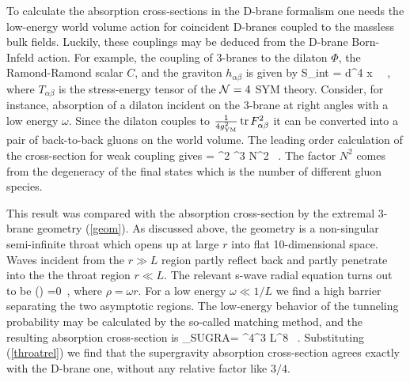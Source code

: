 \documentclass[12pt]{article}
\begin{document}
To calculate the absorption cross-sections in the D-brane formalism one
needs the low-energy world volume action for coincident D-branes coupled to
the massless bulk fields. Luckily, these couplings may be deduced
from the D-brane Born-Infeld action. For example, the coupling
of 3-branes to the dilaton $\Phi$, the Ramond-Ramond scalar $C$,
and the graviton $h_{\alpha\beta}$ is given by \cite{kleb,gukt}
\be \label{sint}
   S_{\rm int} = {\sqrt \pi\over\kappa}
\int d^4 x \,  \ ,
 \ee
 where $T_{\alpha\beta}$ is
the stress-energy tensor of the ${\cal N}=4$ SYM theory.
Consider, for instance, absorption of a dilaton incident on the 3-brane
at right angles with a low energy
$\omega$. Since the dilaton couples to 
${1\over 4 g_{\rm YM}^2}\mathop{\rm tr}\nolimits F_{\alpha\beta}^2$
it can be converted into a pair of back-to-back gluons on the world volume.
The leading order calculation of the cross-section
for weak coupling gives \cite{kleb}
\be\label{absorb}
   \sigma = {\kappa^2  \omega^3 N^2 \pi} \ .
 \ee
The factor $N^2$ comes from the degeneracy of
the final states which is the number of different gluon species.

This result was compared with the absorption cross-section by
the extremal 3-brane geometry (\ref{geom}).
As discussed above, the geometry
is a non-singular semi-infinite throat which opens up at large
$r$ into flat 10-dimensional space. 
Waves incident from the $r \gg L$ region partly reflect back and
partly penetrate into the the throat region $r \ll L$.
The relevant s-wave radial equation turns out to be \cite{kleb}
\be
\label{Coulthree}
 \psi(\rho) =0\ ,
\ee
where $\rho = \omega r$. For a low energy $\omega \ll 1/L$ we find
a high barrier separating the two asymptotic regions.
The low-energy behavior of the tunneling probability may be calculated
by the so-called matching method, and the resulting absorption
cross-section is \cite{kleb}
\be
\label{three}
\sigma_{SUGRA}= {\pi^4}\omega^3 L^8 \ .
\ee
Substituting (\ref{throatrel}) we find that the supergravity
absorption cross-section agrees exactly with the D-brane one,
without any relative factor like $3/4$.
\end{document}
